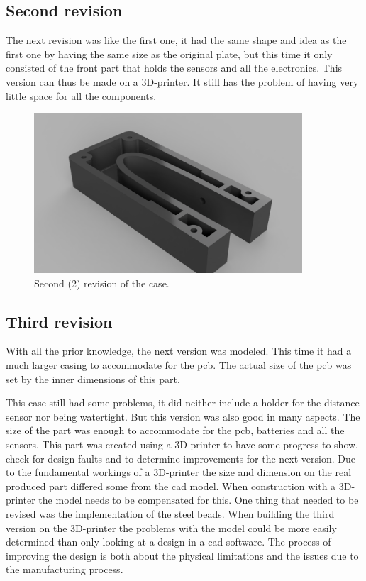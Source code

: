 \subsection{Second revision}
The next revision was like the first one, it had the same shape and idea as the first one by having the same size as the original plate, but this time it only consisted of the front part that holds the sensors and all the electronics. This version can thus be made on a 3D-printer. It still has the problem of having very little space for all the components.    

\begin{figure}[H]
\begin{center}
	\includegraphics[width = 10cm]{Figures/Case_rev_2.png}
	\caption{Second (2) revision of the case.}
	\label{Case_rev_2}
\end{center}
\end{figure}

\subsection{Third revision}
With all the prior knowledge, the next version was modeled. This time it had a much larger casing to accommodate for the \gls{pcb}. The actual size of the \gls{pcb} was set by the inner dimensions of this part.  

This case still had some problems, it did neither include a holder for the distance sensor nor being watertight. But this version was also good in many aspects. The size of the part was enough to accommodate for the \gls{pcb}, batteries and all the sensors.  
This part was created using a 3D-printer to have some progress to show, check for design faults and to determine improvements for the next version.  
Due to the fundamental workings of a 3D-printer the size and dimension on the real produced part differed some from the \gls{cad} model. When construction with a 3D-printer the model needs to be compensated for this. One thing that needed to be revised was the implementation of the steel beads.  
When building the third version on the 3D-printer the problems with the model could be more easily determined than only looking at a design in a \gls{cad} software. The process of improving the design is both about the physical limitations and the issues  due to the manufacturing process. 

